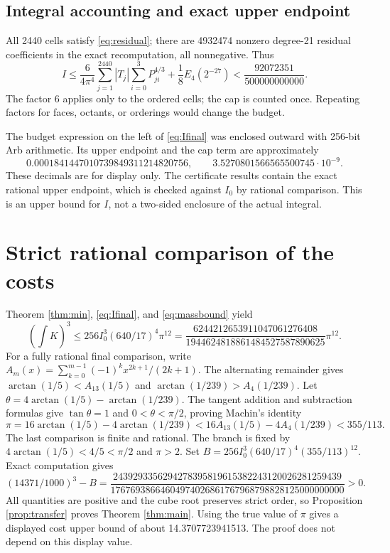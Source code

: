 \documentclass[11pt,a4paper]{article}
\theoremstyle{remark}\newtheorem{remark}[theorem]{Remark}
\newcommand{\1}{\mathbf1}\newcommand{\pos}[1]{(#1)_+}
\begin{document}
\subsection{Integral accounting and exact upper endpoint}
All 2440 cells satisfy \eqref{eq:residual}; there are 4932474 nonzero degree-21 residual coefficients in the exact recomputation, all nonnegative. Thus
\begin{equation}\label{eq:Ifinal}
 I\le\frac6{4\pi^4}\sum_{j=1}^{2440}|T_j|\sum_{i=0}^3P_{ji}^{4/3}
 +\frac18E_4(2^{-27})<\frac{92072351}{500000000000}.
\end{equation}
The factor 6 applies only to the ordered cells; the cap is counted once. Repeating factors for faces, octants, or orderings would change the budget.

The budget expression on the left of \eqref{eq:Ifinal} was enclosed outward with 256-bit Arb arithmetic. Its upper endpoint and the cap term are approximately
\[ 0.0001841447010739849311214820756,\qquad3.5270801566565500745\cdot10^{-9}.\]
These decimals are for display only. The certificate results contain the exact rational upper endpoint, which is checked against $I_0$ by rational comparison. This is an upper bound for $I$, not a two-sided enclosure of the actual integral.

\section{Strict rational comparison of the costs}
Theorem \ref{thm:min}, \eqref{eq:Ifinal}, and \eqref{eq:massbound} yield
\[
 (\int K)^3\le256I_0^3(640/17)^4\pi^{12}
 =\frac{6244212653911047061276408}{1944624818861484527587890625}\pi^{12}.
\]
For a fully rational final comparison, write $A_m(x)=\sum_{k=0}^{m-1}(-1)^kx^{2k+1}/(2k+1)$. The alternating remainder gives
$\arctan(1/5)<A_{13}(1/5)$ and $\arctan(1/239)>A_4(1/239)$. Let $\theta=4\arctan(1/5)-\arctan(1/239)$. The tangent addition and subtraction formulas give $\tan\theta=1$ and $0<\theta<\pi/2$, proving Machin's identity
\[
 \pi=16\arctan(1/5)-4\arctan(1/239)
 <16A_{13}(1/5)-4A_4(1/239)<355/113.
\]
The last comparison is finite and rational. The branch is fixed by $4\arctan(1/5)<4/5<\pi/2$ and $\pi>2$.
Set $B=256I_0^3(640/17)^4(355/113)^{12}$. Exact computation gives
\[
 (14371/1000)^3-B=
 \frac{2439293356294278395819615382243120026281259439}
 {17676938664604974026861767968798828125000000000}>0.
\]
All quantities are positive and the cube root preserves strict order, so Proposition \ref{prop:transfer} proves Theorem \ref{thm:main}. Using the true value of $\pi$ gives a displayed cost upper bound of about 14.3707723941513. The proof does not depend on this display value.
\end{document}
